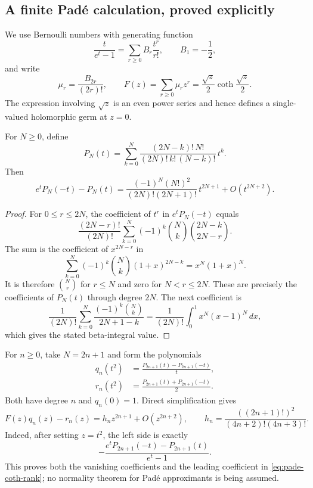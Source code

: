 \subsection{A finite Pad\'e calculation, proved explicitly}

We use Bernoulli numbers with generating function
\[
 \frac{t}{e^t-1}=\sum_{r\geq0}B_r\frac{t^r}{r!},
 \qquad B_1=-\frac12,
\]
and write
\[
 \mu_r=\frac{B_{2r}}{(2r)!},\qquad
 F(z)=\sum_{r\geq0}\mu_rz^r
     =\frac{\sqrt z}{2}\coth\frac{\sqrt z}{2}.
\]
The expression involving $\sqrt z$ is an even power series and hence
defines a single-valued holomorphic germ at $z=0$.

\begin{lemma}
\label{lem:exp-pade-rank}
For $N\geq0$, define
\[
 P_N(t)=\sum_{k=0}^N
   \frac{(2N-k)!\,N!}{(2N)!\,k!\,(N-k)!}\,t^k.
\]
Then
\begin{equation}\label{eq:exp-pade-rank}
 e^tP_N(-t)-P_N(t)
 =\frac{(-1)^N(N!)^2}{(2N)!(2N+1)!}\,t^{2N+1}
  +O(t^{2N+2}).
\end{equation}
\end{lemma}

\begin{proof}
For $0\leq r\leq2N$, the coefficient of $t^r$ in
$e^tP_N(-t)$ equals
\[
 \frac{(2N-r)!}{(2N)!}
 \sum_{k=0}^N(-1)^k\binom Nk
                 \binom{2N-k}{2N-r}.
\]
The sum is the coefficient of $x^{2N-r}$ in
\[
 \sum_{k=0}^N(-1)^k\binom Nk(1+x)^{2N-k}
 =x^N(1+x)^N.
\]
It is therefore $\binom Nr$ for $r\leq N$ and zero for $N<r\leq2N$.
These are precisely the coefficients of $P_N(t)$ through degree
$2N$.  The next coefficient is
\[
 \frac1{(2N)!}\sum_{k=0}^N
       \frac{(-1)^k\binom Nk}{2N+1-k}
 =\frac1{(2N)!}\int_0^1x^N(x-1)^N\,dx,
\]
which gives the stated beta-integral value.
\end{proof}

For $n\geq0$, take $N=2n+1$ and form the polynomials
\begin{align}
 q_n(t^2)&=\frac{P_{2n+1}(t)-P_{2n+1}(-t)}t,
 \\
 r_n(t^2)&=\frac{P_{2n+1}(t)+P_{2n+1}(-t)}2.
\end{align}
Both have degree $n$ and $q_n(0)=1$.  Direct simplification gives
\begin{equation}\label{eq:pade-coth-rank}
 F(z)q_n(z)-r_n(z)
 =h_nz^{2n+1}+O(z^{2n+2}),
 \qquad
 h_n=\frac{((2n+1)!)^2}{(4n+2)!(4n+3)!}.
\end{equation}
Indeed, after setting $z=t^2$, the left side is exactly
\[
 -\frac{e^tP_{2n+1}(-t)-P_{2n+1}(t)}{e^t-1}.
\]
This proves both the vanishing coefficients and the leading
coefficient in \eqref{eq:pade-coth-rank}; no normality theorem for
Pad\'e approximants is being assumed.

